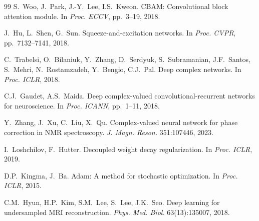 \documentclass{article}
\begin{document}
{\begin{thebibliography}{99}
S.~Woo, J.~Park, J.-Y.~Lee, I.S.~Kweon.
CBAM: Convolutional block attention module.
In \textit{Proc. ECCV}, pp.~3--19, 2018.

J.~Hu, L.~Shen, G.~Sun.
Squeeze-and-excitation networks.
In \textit{Proc. CVPR}, pp.~7132--7141, 2018.

C.~Trabelsi, O.~Bilaniuk, Y.~Zhang, D.~Serdyuk, S.~Subramanian, J.F.~Santos, S.~Mehri, N.~Rostamzadeh, Y.~Bengio, C.J.~Pal.
Deep complex networks.
In \textit{Proc. ICLR}, 2018.

C.J.~Gaudet, A.S.~Maida.
Deep complex-valued convolutional-recurrent networks for neuroscience.
In \textit{Proc. ICANN}, pp.~1--11, 2018.

Y.~Zhang, J.~Xu, C.~Liu, X.~Qu.
Complex-valued neural network for phase correction in NMR spectroscopy.
\textit{J. Magn. Reson.} 351:107446, 2023.

I.~Loshchilov, F.~Hutter.
Decoupled weight decay regularization.
In \textit{Proc. ICLR}, 2019.

D.P.~Kingma, J.~Ba.
Adam: A method for stochastic optimization.
In \textit{Proc. ICLR}, 2015.

C.M.~Hyun, H.P.~Kim, S.M.~Lee, S.~Lee, J.K.~Seo.
Deep learning for undersampled MRI reconstruction.
\textit{Phys. Med. Biol.} 63(13):135007, 2018.

\end{thebibliography}
}
\end{document}
